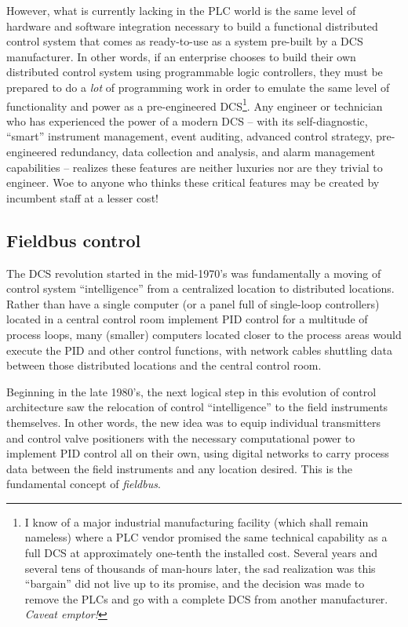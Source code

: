 However, what is currently lacking in the PLC world is the same level of hardware and software integration necessary to build a functional distributed control system that comes as ready-to-use as a system pre-built by a DCS manufacturer.  In other words, if an enterprise chooses to build their own distributed control system using programmable logic controllers, they must be prepared to do a \textit{lot} of programming work in order to emulate the same level of functionality and power as a pre-engineered DCS\footnote{I know of a major industrial manufacturing facility (which shall remain nameless) where a PLC vendor promised the same technical capability as a full DCS at approximately one-tenth the installed cost.  Several years and several tens of thousands of man-hours later, the sad realization was this ``bargain'' did not live up to its promise, and the decision was made to remove the PLCs and go with a complete DCS from another manufacturer.  \textit{Caveat emptor!}}.  Any engineer or technician who has experienced the power of a modern DCS -- with its self-diagnostic, ``smart'' instrument management, event auditing, advanced control strategy, pre-engineered redundancy, data collection and analysis, and alarm management capabilities -- realizes these features are neither luxuries nor are they trivial to engineer.  Woe to anyone who thinks these critical features may be created by incumbent staff at a lesser cost!











\filbreak
\subsection{Fieldbus control}

The DCS revolution started in the mid-1970's was fundamentally a moving of control system ``intelligence'' from a centralized location to distributed locations.  Rather than have a single computer (or a panel full of single-loop controllers) located in a central control room implement PID control for a multitude of process loops, many (smaller) computers located closer to the process areas would execute the PID and other control functions, with network cables shuttling data between those distributed locations and the central control room.

Beginning in the late 1980's, the next logical step in this evolution of control architecture saw the relocation of control ``intelligence'' to the field instruments themselves.  In other words, the new idea was to equip individual transmitters and control valve positioners with the necessary computational power to implement PID control all on their own, using digital networks to carry process data between the field instruments and any location desired.  This is the fundamental concept of \textit{fieldbus}.  

